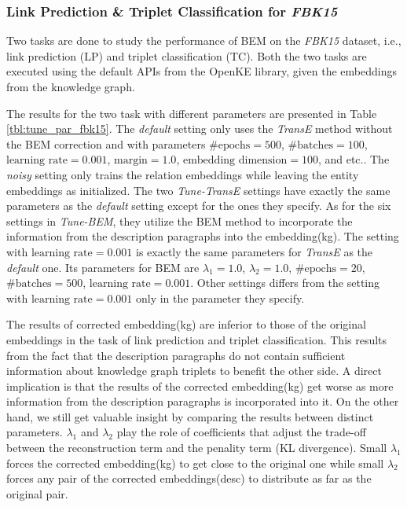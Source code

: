 \subsubsection{Link Prediction \& Triplet Classification for \textit{FBK15}}
Two tasks are done to study the performance of BEM on the \textit{FBK15} dataset, i.e., link prediction (LP) and triplet classification (TC). Both the two tasks are executed using the default APIs from the OpenKE library, given the embeddings from the knowledge graph.

The results for the two task with different parameters are presented in Table \ref{tbl:tune_par_fbk15}. The \textit{default} setting only uses the \textit{TransE} method without the BEM correction and with parameters $\#\text{epochs} = 500$, $\# \text{batches} = 100$, $\text{learning~rate} = 0.001$, $\text{margin} = 1.0$, $\text{embedding~dimension} = 100$, and etc.. The \textit{noisy} setting only trains the relation embeddings while leaving the entity embeddings as initialized. The two \textit{Tune-TransE} settings have exactly the same parameters as the \textit{default} setting except for the ones they specify. As for the six settings in \textit{Tune-BEM}, they utilize the BEM method to incorporate the information from the description paragraphs into the embedding(kg). The setting with $\text{learning rate} = 0.001$ is exactly the same parameters for \textit{TransE} as the \textit{default} one. Its parameters for BEM are $\lambda_1 = 1.0$, $\lambda_2 = 1.0$, $\# \text{epochs} = 20$, $\# \text{batches} = 500$, $\text{learning~rate} = 0.001$. Other settings differs from the setting with $\text{learning rate} = 0.001$ only in the parameter they specify.

The results of corrected embedding(kg) are inferior to those of the original embeddings in the task of link prediction and triplet classification. This results from the fact that the description paragraphs do not contain sufficient information about knowledge graph triplets to benefit the other side. A direct implication is that the results of the corrected embedding(kg) get worse as more information from the description paragraphs is incorporated into it. On the other hand, we still get valuable insight by comparing the results between distinct parameters. $\lambda_1$ and $\lambda_2$ play the role of coefficients that adjust the trade-off between the reconstruction term and the penality term (KL divergence). Small $\lambda_1$ forces the corrected embedding(kg) to get close to the original one while small $\lambda_2$ forces any pair of the corrected embeddings(desc) to distribute as far as the original pair. 


